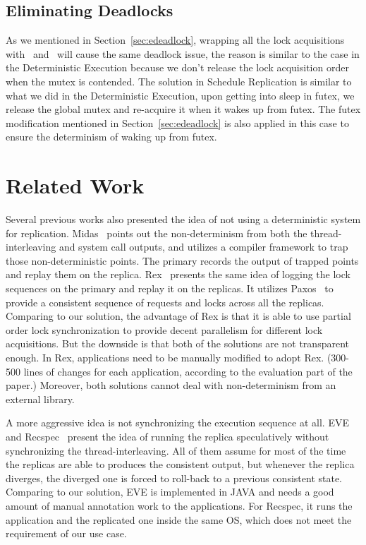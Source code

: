 \subsection{Eliminating Deadlocks} \label{sec:rdeadlock}
As we mentioned in Section~\ref{sec:edeadlock}, wrapping all the lock acquisitions with \detstart\ and \detend\ will cause the same deadlock issue, the reason is similar to the case in the Deterministic Execution because we don't release the lock acquisition order when the mutex is contended. The solution in Schedule Replication is similar to what we did in the Deterministic Execution, upon getting into sleep in futex, we release the global mutex and re-acquire it when it wakes up from futex. The futex modification mentioned in Section~\ref{sec:edeadlock} is also applied in this case to ensure the determinism of waking up from futex.

\section{Related Work}
Several previous works also presented the idea of not using a deterministic system for replication. Midas~\cite{slember2006static} points out the non-determinism from both the thread-interleaving and system call outputs, and utilizes a compiler framework to trap those non-deterministic points. The primary records the output of trapped points and replay them on the replica. Rex~\cite{guo2014rex} presents the same idea of logging the lock sequences on the primary and replay it on the replicas. It utilizes Paxos~\cite{lamport2001paxos} to provide a consistent sequence of requests and locks across all the replicas. Comparing to our solution, the advantage of Rex is that it is able to use partial order lock synchronization to provide decent parallelism for different lock acquisitions. But the downside is that both of the solutions are not transparent enough. In Rex, applications need to be manually modified to adopt Rex. (300-500 lines of changes for each application, according to the evaluation part of the paper.) Moreover, both solutions cannot deal with non-determinism from an external library.

A more aggressive idea is not synchronizing the execution sequence at all. EVE~\cite{kapritsos2012all} and Recspec~\cite{lee2010respec} present the idea of running the replica speculatively without synchronizing the thread-interleaving. All of them assume for most of the time the replicas are able to produces the consistent output, but whenever the replica diverges, the diverged one is forced to roll-back to a previous consistent state. Comparing to our solution, EVE is implemented in JAVA and needs a good amount of manual annotation work to the applications. For Recspec, it runs the application and the replicated one inside the same OS, which does not meet the requirement of our use case.